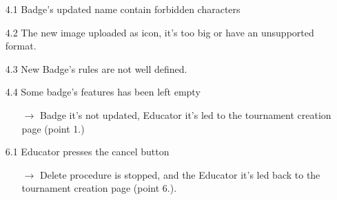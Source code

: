 \documentclass{article}
\begin{document}
{\begin{enumerate}
\begin{xltabular}{\textwidth}
\begin{itemize}
                  \item[4.1] Badge's updated name contain forbidden characters
                  \item[4.2] The new image uploaded as icon, it's too big or have an unsupported format.
                  \item[4.3] New Badge's rules are not well defined.
                  \item[4.4] Some badge's features has been left empty
                        \begin{itemize}
                            \item[$\rightarrow$] Badge it's not updated, Educator it's led to
                                  the tournament creation page (point 1.)
                        \end{itemize}
                  \item[6.1] Educator presses the cancel button
                        \begin{itemize}
                            \item[$\rightarrow$] Delete procedure is stopped, and the Educator
                                  it's led back to the tournament creation page (point 6.).
                        \end{itemize}

              \end{itemize}
          \end{xltabular}


\end{enumerate}}
\end{document}
